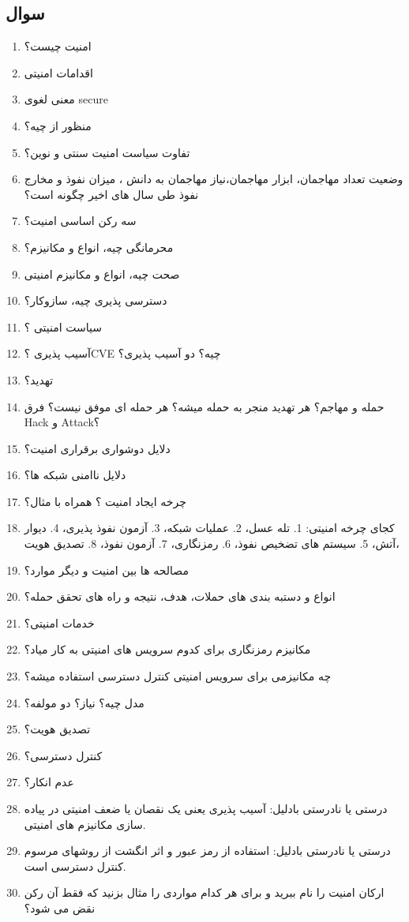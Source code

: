 \documentclass{report}
\begin{document}
	\subsection{سوال}
		\begin{enumerate}
			\item 
			امنیت چیست؟
			\item
			اقدامات امنیتی 
			\item 
			معنی لغوی secure
			\item
			منظور از
			چیه؟
			\item 
			تفاوت سیاست امنیت سنتی و نوین؟
			\item
			وضعیت تعداد مهاجمان، ابزار مهاجمان،نیاز مهاجمان به دانش ، میزان نفوذ و مخارج نفوذ طی سال های اخیر چگونه است؟
			\item
			سه رکن اساسی امنیت؟
			\item 
			محرمانگی چیه، انواع و مکانیزم؟
			\item
			صحت چیه، انواع و مکانیزم امنیتی
			\item 
			دسترسی پذیری چیه، سازوکار؟
			\item
			سیاست امنیتی ؟
			\item
			آسیب پذیری ؟CVE چیه؟ دو آسیب پذیری؟
			\item 
			تهدید؟
			\item
			حمله و مهاجم؟ هر تهدید منجر به حمله میشه؟ هر حمله ای موفق نیست؟ فرق Hack و Attack؟
			\item  
			دلایل دوشواری برقراری امنیت؟
			\item
			دلایل ناامنی شبکه ها؟
			\item
			چرخه ایجاد امنیت ؟ همراه با مثال؟
			\item 
			کجای چرخه امنیتی:
			1. تله عسل،
			2. عملیات شبکه،
			3. آزمون نفوذ پذیری،
			4. دیوار آتش،
			5. سیستم های تضخیص نفوذ،
			6. رمزنگاری،
			7. آزمون نفوذ،	
			8. تصدیق هویت،
			\item 
			مصالحه ها بین امنیت و دیگر موارد؟
			\item
			انواع و دستبه بندی های حملات، هدف، نتیجه و راه های تحقق حمله؟
			\item
			خدمات امنیتی؟
			\item 
			مکانیزم رمزنگاری برای کدوم سرویس های امنیتی به کار میاد؟
			\item
			چه مکانیزمی برای سرویس امنیتی کنترل دسترسی استفاده میشه؟
			\item 
			مدل چیه؟ نیاز؟ دو مولفه؟
			\item
			تصدیق هویت؟
			\item 
			کنترل دسترسی؟
			\item 
			عدم انکار؟
			\item 
			درستی یا نادرستی بادلیل: آسیب پذیری یعنی یک نقصان یا ضعف امنیتی در پیاده سازی مکانیزم های امنیتی.
			\item
			درستی یا نادرستی بادلیل: استفاده از رمز عبور و اثر انگشت از روشهای مرسوم کنترل دسترسی است.
			\item 
			ارکان امنیت را نام ببرید و برای هر کدام مواردی را مثال بزنید که فقط آن رکن نقض می شود؟
			
		\end{enumerate}
\end{document}
